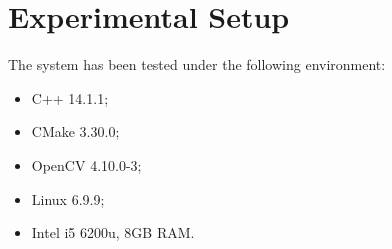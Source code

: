\section{Experimental Setup}


The system has been tested under the following environment:
\begin{itemize}
    \item C++ 14.1.1;
    \item CMake 3.30.0;
    \item OpenCV 4.10.0-3;
    \item Linux 6.9.9;
    \item Intel i5 6200u, 8GB RAM.
\end{itemize}